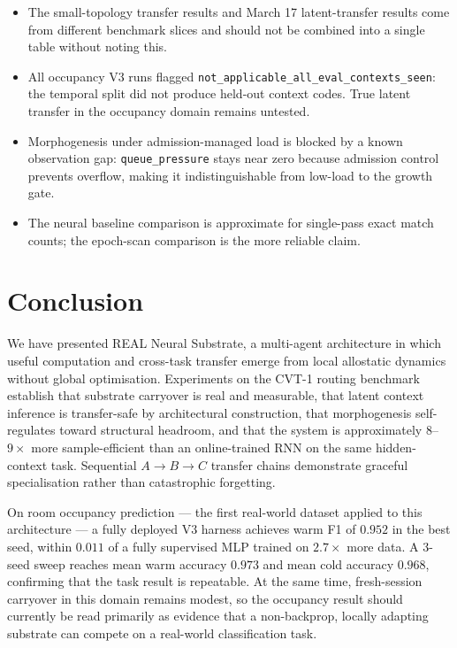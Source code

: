 \documentclass[10pt,twocolumn]{article}
\begin{document}
\begin{itemize}[leftmargin=*, topsep=2pt, itemsep=1pt]
  \item The small-topology transfer results and March 17 latent-transfer
        results come from different benchmark slices and should not be
        combined into a single table without noting this.
  \item All occupancy V3 runs flagged
        \texttt{not\_applicable\_all\_eval\_contexts\_seen}: the temporal
        split did not produce held-out context codes.
        True latent transfer in the occupancy domain remains untested.
  \item Morphogenesis under admission-managed load is blocked by a
        known observation gap: \texttt{queue\_pressure} stays near zero
        because admission control prevents overflow, making it
        indistinguishable from low-load to the growth gate.
  \item The neural baseline comparison is approximate for single-pass exact
        match counts; the epoch-scan comparison is the more reliable claim.
\end{itemize}

\section{Conclusion}
\label{sec:conclusion}

We have presented REAL Neural Substrate, a multi-agent architecture in which
useful computation and cross-task transfer emerge from local allostatic
dynamics without global optimisation.
Experiments on the CVT-1 routing benchmark establish that substrate carryover
is real and measurable, that latent context inference is transfer-safe by
architectural construction, that morphogenesis self-regulates toward structural
headroom, and that the system is approximately $8$--$9\times$ more
sample-efficient than an online-trained RNN on the same hidden-context task.
Sequential $A \to B \to C$ transfer chains demonstrate graceful specialisation
rather than catastrophic forgetting.

On room occupancy prediction --- the first real-world dataset applied to this
architecture --- a fully deployed V3 harness achieves warm F1 of $0.952$ in
the best seed, within $0.011$ of a fully supervised MLP trained on
$2.7\times$ more data.
A 3-seed sweep reaches mean warm accuracy $0.973$ and mean cold accuracy
$0.968$, confirming that the task result is repeatable.
At the same time, fresh-session carryover in this domain remains modest, so
the occupancy result should currently be read primarily as evidence that a
non-backprop, locally adapting substrate can compete on a real-world
classification task.
\end{document}
